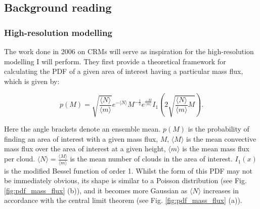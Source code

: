 \documentclass[11pt,a4paper]{article}
\begin{document}
\resetgeometry

\subsection{Background reading}

\subsubsection{High-resolution modelling}

The work done in 2006 on CRMs \parencite{craig2006fluctuations, cohen2006fluctuations} will serve as inspiration for the high-resolution modelling I will perform. They first provide a theoretical framework for calculating the PDF of a given area of interest having a particular mass flux, which is given by:

\begin{equation}
    p(M) = \sqrt{\frac{\langle N \rangle}{\langle m \rangle}} e^{-\langle N \rangle} M^{-\frac{1}{2}} e^{\frac{-M}{\langle m \rangle}} I_1\left(2 \sqrt{\frac{\langle N \rangle}{\langle m \rangle} M}\right).
    \label{eqn:pdf_mass_flux}
\end{equation}

Here the angle brackets denote an ensemble mean. $p(M)$ is the probability of finding an area of interest with a given mass flux, $M$, $\langle M \rangle$ is the mean convective mass flux over the area of interest at a given height, $\langle m \rangle$ is the mean mass flux per cloud. $\langle N \rangle = \frac{\langle M \rangle}{\langle m \rangle}$ is the mean number of clouds in the area of interest. $I_1(x)$ is the modified Bessel function of order 1. Whilst the form of this PDF may not be immediately obvious, its shape is similar to a Poisson distribution (see Fig. \ref{fig:pdf_mass_flux} (b)), and it becomes more Gaussian as $\langle N \rangle$ increases in accordance with the central limit theorem (see Fig. \ref{fig:pdf_mass_flux} (a)).
\end{document}
